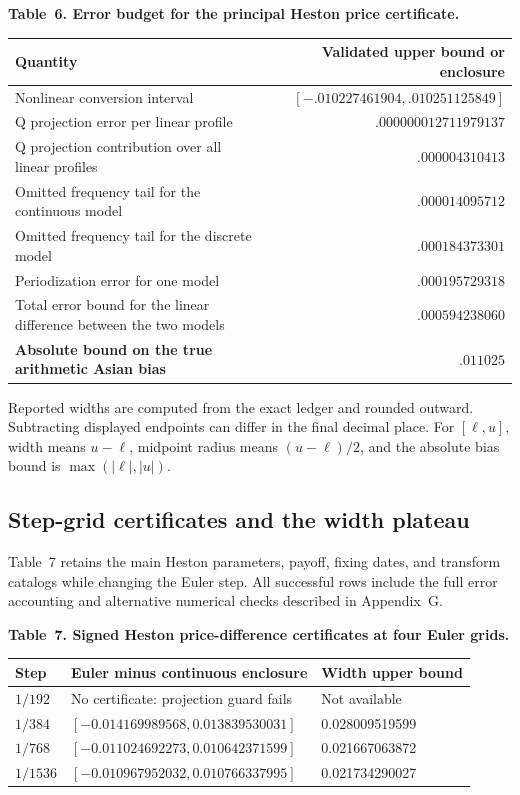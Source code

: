 \noindent\textbf{Table~6. Error budget for the principal Heston price certificate.}
\begin{center}
\begin{tabularx}{\textwidth}{@{}X r@{}}
\toprule
Quantity & Validated upper bound or enclosure \\
\midrule
Nonlinear conversion interval & \([-.010227461904,.010251125849]\) \\
Q projection error per linear profile & \(.000000012711979137\) \\
Q projection contribution over all linear profiles & \(.000004310413\) \\
Omitted frequency tail for the continuous model & \(.000014095712\) \\
Omitted frequency tail for the discrete model & \(.000184373301\) \\
Periodization error for one model & \(.000195729318\) \\
Total error bound for the linear difference between the two models & \(.000594238060\) \\
\textbf{Absolute bound on the true arithmetic Asian bias} & \(\boldsymbol{.011025}\) \\
\bottomrule
\end{tabularx}
\end{center}

Reported widths are computed from the exact ledger and rounded outward.
Subtracting displayed endpoints can differ in the final decimal place.
For \([\ell,u]\), width means \(u-\ell\), midpoint radius means
\((u-\ell)/2\), and the absolute bias bound is
\(\max(|\ell|,|u|)\).

\subsection{Step-grid certificates and the width plateau}

Table~7 retains the main Heston parameters, payoff, fixing dates, and transform
catalogs while changing the Euler step. All successful rows include the full
error accounting and alternative numerical checks described in Appendix~G.

\noindent\textbf{Table~7. Signed Heston price-difference certificates at four Euler grids.}
\begin{center}
\begin{tabularx}{\textwidth}{@{}l X X@{}}
\toprule
Step & Euler minus continuous enclosure & Width upper bound \\
\midrule
\(1/192\) & No certificate: projection guard fails & Not available \\
\(1/384\) & \([-0.014169989568,0.013839530031]\) & 0.028009519599 \\
\(1/768\) & \([-0.011024692273,0.010642371599]\) & 0.021667063872 \\
\(1/1536\) & \([-0.010967952032,0.010766337995]\) & 0.021734290027 \\
\bottomrule
\end{tabularx}
\end{center}

